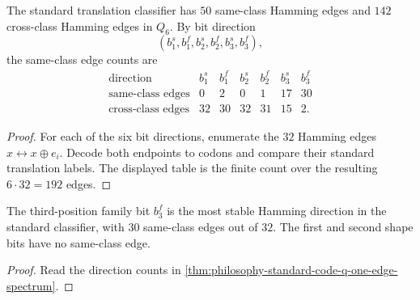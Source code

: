 \begin{theorem}
\label{thm:philosophy-standard-code-q-one-edge-spectrum}
The standard translation classifier has $50$ same-class Hamming edges
and $142$ cross-class Hamming edges in $Q_{6}$. By bit direction
$$(b_{1}^{s},b_{1}^{f},b_{2}^{s},b_{2}^{f},b_{3}^{s},b_{3}^{f}),$$
the same-class edge counts are
$$
\begin{array}{c|rrrrrr}
  \text{direction}
    & b_{1}^{s} & b_{1}^{f} & b_{2}^{s}
    & b_{2}^{f} & b_{3}^{s} & b_{3}^{f}\\
\hline
  \text{same-class edges}
    & 0 & 2 & 0 & 1 & 17 & 30\\
  \text{cross-class edges}
    & 32 & 30 & 32 & 31 & 15 & 2.
\end{array}
$$
\end{theorem}
\begin{proof}
For each of the six bit directions, enumerate the $32$ Hamming edges
$x\leftrightarrow x\oplus e_i$. Decode both endpoints to codons and
compare their standard translation labels. The displayed table is the
finite count over the resulting $6\cdot 32=192$ edges.
\end{proof}

\begin{corollary}
\label{cor:philosophy-third-position-softness}
The third-position family bit $b_{3}^{f}$ is the most stable Hamming
direction in the standard classifier, with $30$ same-class edges out of
$32$. The first and second shape bits have no same-class edge.
\end{corollary}
\begin{proof}
Read the direction counts in
\autoref{thm:philosophy-standard-code-q-one-edge-spectrum}.
\end{proof}

